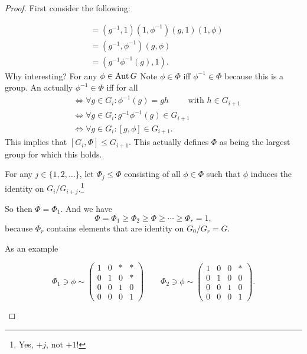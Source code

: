 \begin{proof}
    First consider the following:
    
    
    \begin{align*}
        [g, \phi] &= (g^{-1}, 1)(1, \phi^{-1})(g, 1) (1, \phi)\\
                  &= (g^{-1}, \phi^{-1})(g, \phi)\\
                  &= (g^{-1} \phi^{-1}(g), 1)
    .\end{align*}
    Why interesting?
    For any $\phi \in \operatorname{Aut} G$
    Note $\phi \in \Phi$ iff $\phi^{-1} \in \Phi$ because this is a group.
    An actually $\phi^{-1} \in \Phi$ iff for all 
    \begin{align*}
     &\iff \forall g \in G_i:  \phi^{-1}(g) = gh \qquad \text{ with } h \in G_{i+1}\\
     &\iff \forall g \in G_i: g^{-1} \phi^{-1}(g) \in G_{i+1}\\
     &\iff \forall g \in G_i:  [g, \phi] \in G_{i+1}
    .\end{align*} 
    This implies that $[G_i, \Phi] \le  G_{i+1}$.
    This actually defines $\Phi$ as being the largest group for which this holds.


For any $j \in \{1, 2, \ldots\} $, let $\Phi_j \le  \Phi$ consisting of all $\phi \in \Phi$ such that $\phi$ induces the identity on $G_i / G_{i+j}$.\footnote{Yes, $+j$, not  $+1$!}

So then $\Phi = \Phi_1$.
And we have
\[
\Phi = \Phi_1 \ge  \Phi_2 \ge  \Phi \ge  \cdots \ge  \Phi_r = 1
,\] 
because $\Phi_r$ contains elements that are identity on  $ G_0  / G_r = G$.


\begin{remark}
    As an example

    \[
    \Phi_1\ni\phi  \sim \begin{pmatrix}
        1 & 0 & * & *\\
        0 & 1 & 0 & *\\
        0 & 0 & 1 & 0 \\
        0 & 0 & 0 & 1
    \end{pmatrix}
\qquad
    \Phi_2\ni\phi   \sim \begin{pmatrix}
        1 & 0 & 0 & *\\
        0 & 1 & 0 & 0\\
        0 & 0 & 1 & 0 \\
        0 & 0 & 0 & 1
    \end{pmatrix}
    .\] 
\end{remark}


\end{proof}

